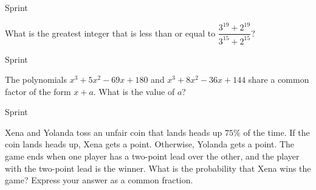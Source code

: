 \documentclass[9pt]{beamer}
\begin{document}
\begin{frame}[t]{Sprint \insertframenumber}
\begin{block}{}
    What is the greatest integer that is less than or equal to $ \dfrac{3^{19} + 2^{19}}{3^{15} + 2^{15}} $?
    
\end{block}
\end{frame}

\begin{frame}[t]{Sprint \insertframenumber}
\begin{block}{}
    The polynomials $ x^3+5x^2-69x+180 $ and $ x^3+8x^2-36x+144 $ share a common
factor of the form $ x + a $. What is the value of $ a $?
    
\end{block}
\end{frame}

\begin{frame}[t]{Sprint \insertframenumber}
\begin{block}{}
    Xena and Yolanda toss an unfair coin that lands heads up $ 75\% $ of the time. If the coin lands heads up, Xena gets a point. Otherwise, Yolanda gets a point. The game ends when one player has a two-point lead over the other, and the player with the two-point lead is the winner. What is the probability that Xena wins the game? Express your answer as a common fraction.
    
\end{block}
\end{frame}
\end{document}
